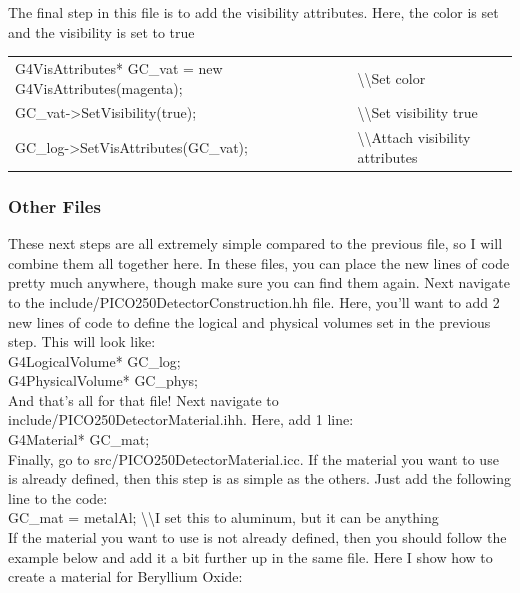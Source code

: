 \documentclass[%
12pt,
twoside,
reprint,
amsmath,amssymb,
aps,
]{article}
\begin{document}
	\noindent The final step in this file is to add the visibility attributes. Here, the color is set and the visibility is set to true
	
	\begin{table}[!h]
		\begin{tabular}{ll}
			G4VisAttributes* GC\_vat = new G4VisAttributes(magenta); & \textbackslash\textbackslash Set color \\	
			GC\_vat->SetVisibility(true); & \textbackslash\textbackslash Set visibility true \\
			GC\_log->SetVisAttributes(GC\_vat); & \textbackslash\textbackslash Attach visibility attributes \\
		\end{tabular}
	\end{table}

	\subsubsection{Other Files}
	\par These next steps are all extremely simple compared to the previous file, so I will combine them all together here. In these files, you can place the new lines of code pretty much anywhere, though make sure you can find them again. Next navigate to the include/PICO250DetectorConstruction.hh file. Here, you'll want to add 2 new lines of code to define the logical and physical volumes set in the previous step. This will look like: \\
	
 	\noindent G4LogicalVolume* GC\_log; \\
	G4PhysicalVolume* GC\_phys; \\
	
	\noindent And that's all for that file! Next navigate to include/PICO250DetectorMaterial.ihh. Here, add 1 line: \\
	
	\noindent G4Material* GC\_mat; \\
	
	\noindent Finally, go to src/PICO250DetectorMaterial.icc. If the material you want to use is already defined, then this step is as simple as the others. Just add the following line to the code: \\
	
	\noindent GC\_mat = metalAl; \textbackslash\textbackslash I set this to aluminum, but it can be anything \\
	
	\noindent If the material you want to use is not already defined, then you should follow the example below and add it a bit further up in the same file. Here I show how to create a material for Beryllium Oxide: \\
	
\end{document}
